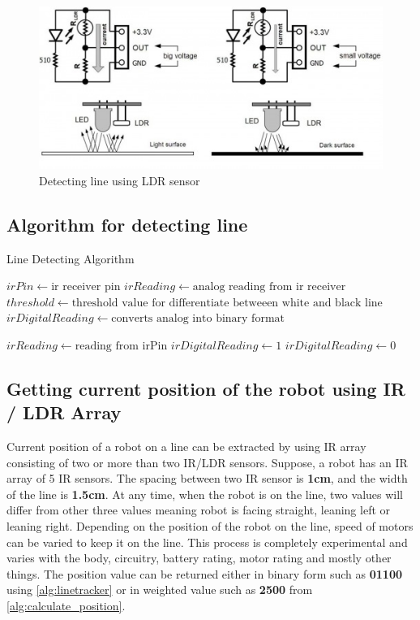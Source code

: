 \documentclass[14pt,a4paper]{extarticle}
\begin{document}
		\begin{figure}[!h]
			\includegraphics[width=\textwidth]{ldr_line.jpg}
			\caption{Detecting line using LDR sensor}
			\label{fig:detect_line_ldr}
		\end{figure}
		
		
		\subsection{Algorithm for detecting line}
		\begin{algorithm}
		\caption{Line Detecting Algorithm}\label{alg:linetracker}
		\begin{algorithmic}[1]
		
		\State $irPin \gets \text{ir receiver pin}$
		\State $irReading \gets \text {analog reading from ir receiver} $
		\State $threshold \gets \text {threshold value for differentiate betweeen white and black line} $
		\State $irDigitalReading \gets \text {converts analog into binary format} $
		
		\State $ irReading \gets \text{reading from irPin}$		
		\State $irDigitalReading \gets 1$
		\Else 
		\State $irDigitalReading \gets 0$
		\EndIf
		\EndProcedure
		\end{algorithmic}
		\end{algorithm}
	
	\subsection{Getting current position of the robot using IR / LDR Array}
	Current position of a robot on a line can be extracted by using IR array consisting of two or more than two IR/LDR sensors. Suppose, a robot has an IR array of 5 IR sensors. The spacing between two IR sensor is \textbf{1cm}, and the width of the line is \textbf{1.5cm}. At any time, when the robot is on the line, two values will differ from other three values meaning robot is facing straight, leaning left or leaning right. Depending on the position of the robot on the line, speed of motors can be varied to keep it on the line. This process is completely experimental and varies with the body, circuitry, battery rating, motor rating and mostly other things. The position value can be returned either in binary form such as \textbf{01100} using \ref{alg:linetracker} or in weighted value such as \textbf{2500} from \ref{alg:calculate_position}.
	
\end{document}
